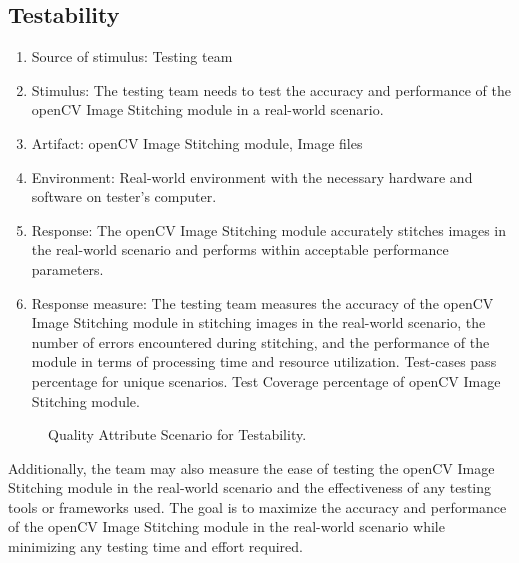 \subsection{Testability\label{subSection::TestabilityQA}}
\begin{enumerate}
    \item Source of stimulus: Testing team
    \item Stimulus: The testing team needs to test the accuracy and performance of the openCV Image Stitching module in a real-world scenario.
    \item Artifact: openCV Image Stitching module, Image files
    \item Environment: Real-world environment with the necessary hardware and software on tester's computer.
    \item Response: The openCV Image Stitching module accurately stitches images in the real-world scenario and performs within acceptable performance parameters.
    \item Response measure: The testing team measures the accuracy of the openCV Image Stitching module in stitching images in the real-world scenario, the number of errors encountered during stitching, and the performance of the module in terms of processing time and resource utilization. Test-cases pass percentage for unique scenarios. Test Coverage percentage of openCV Image Stitching module.
\end{enumerate}
\begin{figure}[H]
\centering
{}
\caption{\label{Figure::Quality Attribute Scenario for Testability} Quality Attribute Scenario for Testability.}
\end{figure}
Additionally, the team may also measure the ease of testing the openCV Image Stitching module in the real-world scenario and the effectiveness of any testing tools or frameworks used. The goal is to maximize the accuracy and performance of the openCV Image Stitching module in the real-world scenario while minimizing any testing time and effort required.
